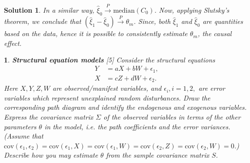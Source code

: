\documentclass[12pt]{article}
\theoremstyle{problemstyle}
\newtheorem{problem}{}
\newtheorem*{solution*}{Solution}
\begin{document}
\begin{solution*}
In a similar way, $\hat{\xi}_0 \xrightarrow{P} \mathrm{median}(C_0)$. Now, applying Slutsky's theorem, we conclude that $(\hat{\xi}_1 - \hat{\xi}_0) \xrightarrow{P} \theta_m$. Since, both $\hat{\xi}_1$ and $\hat{\xi}_0$ are quantities based on the data, hence it is possible to consistently estimate $\theta_m$, the causal effect.



\end{solution*}
\begin{problem}
    \textbf{Structural equation models} \hfill [5]
    \vskip3pt\noindent
    Consider the structural equations
    \begin{align*}
        Y &= aX + bW + \epsilon_1, \\
        X &= c Z + dW + \epsilon_2.
    \end{align*}
    Here $X, Y, Z, W$ are observed/manifest variables, and $\epsilon_i, i = 1, 2,$ are error variables which represent unexplained random disturbances. Draw the corresponding path diagram and identify the endogenous and exogenous variables. Express the covariance matrix $\Sigma$ of the observed variables in terms of the other parameters $\theta$ in the model, i.e. the path coefficients and the error variances. (Assume that $\mathrm{cov}(\epsilon_1, \epsilon_2) = \mathrm{cov}(\epsilon_1, X) = \mathrm{cov}(\epsilon_1, W) = \mathrm{cov}(\epsilon_2, Z) = \mathrm{cov}(\epsilon_2, W) = 0$.) Describe how you may estimate $\theta$ from the sample covariance matrix $S$.  
\end{problem}
\end{document}

